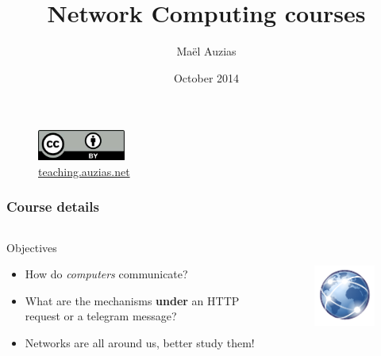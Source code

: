\documentclass[]{beamer}
\title{Network Computing courses}
\author{Maël Auzias}
\institute{ENSIBS - UBS}
\date{October 2014}
\begin{document}
\begin{frame}
  \titlepage
  \begin{figure}[p]
      \centering
      \includegraphics[height=1cm]{./imgs/cc40.jpg}
      \caption{\color{blue}\href{http://teaching.auzias.net}{teaching.auzias.net}}
    \label{fig:cc40}
  \end{figure}
\end{frame}


  \begin{frame}
    \frametitle{Course details}
    \begin{columns}
        \begin{block}{Objectives}
          \begin{itemize}
            \item How do \emph{computers} communicate?
            \item What are the mechanisms \textbf{under} an HTTP request or a telegram message?
            \item Networks are all around us, better study them!
          \end{itemize}
        \end{block}
        \begin{figure}[t]
          \centering
          \includegraphics[height=3cm]{./imgs/ntwks.pdf}
          \label{fig:ntwks}
        \end{figure}
    \end{columns}
  \end{frame}
\end{document}
